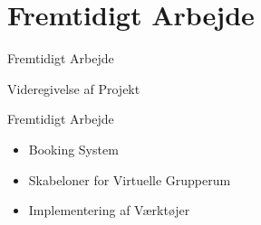 \section*{Fremtidigt Arbejde}

\begin{frame}{Fremtidigt Arbejde}

Videregivelse af Projekt		
	
\end{frame}


\begin{frame}{Fremtidigt Arbejde}
	
	\begin{itemize}
		\item <1-> Booking System
		\item <2-> Skabeloner for Virtuelle Grupperum
		\item <3-> Implementering af V\ae{}rkt\o{}jer
	\end{itemize}
	 
\end{frame}